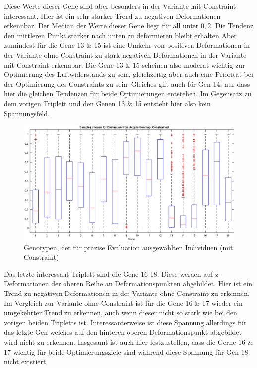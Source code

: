 Diese Werte dieser Gene sind aber besonders in der Variante mit Constraint interessant.
Hier ist ein sehr starker Trend zu negativen Deformationen erkennbar.
Der Median der Werte dieser Gene liegt für all unter $0,2$.
Die Tendenz den mittleren Punkt stärker nach unten zu deformieren bleibt erhalten
Aber zumindest für die Gene 13 \& 15 ist eine Umkehr von positiven Deformationen in der Variante ohne Constraint zu stark negativen Deformationen in der Variante mit Constraint erkennbar.
Die Gene 13 \& 15 scheinen also moderat wichtig zur Optimierung des Luftwiderstands zu sein, gleichzeitig aber auch eine Priorität bei der Optimierung des Constraints zu sein.
Gleiches gilt auch für Gen 14, nur dass hier die gleichen Tendenzen für beide Optimierungen entstehen.
Im Gegensatz zu dem vorigen Triplett und den Genen 13 \& 15 entsteht hier also kein Spannungsfeld.

\begin{figure}[h]
	\centering
	\includegraphics[width=1\linewidth]{bilder/6pt1000Samples/acquisitionDiversityCon}
	\caption{Genotypen, der für präzise Evaluation ausgewählten Individuen (mit Constraint)}
	\label{fig:geneticDivCon}
\end{figure}

Das letzte interessant Triplett sind die Gene 16-18.
Diese werden auf z-Deformationen der oberen Reihe an Deformationspunkten abgebildet.
Hier ist ein Trend zu negativen Deformationen in der Variante ohne Constraint zu erkennen.
Im Vergleich zur Variante ohne Constraint ist für die Gene 16 \& 17 wieder ein umgekehrter Trend zu erkennen, auch wenn dieser nicht so stark wie bei den vorigen beiden Tripletts ist.
Interessanterweise ist diese Spannung allerdings für das letzte Gen welches auf den hinteren oberen Deformationspunkt abgebildet wird nicht zu erkennen.
Insgesamt ist auch hier festzustellen, dass die Gerne 16 \& 17 wichtig für beide Optimierungsziele sind während diese Spannung für Gen 18 nicht existiert.

